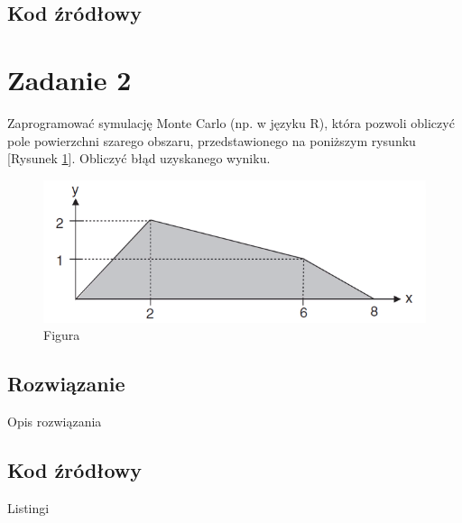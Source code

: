\documentclass[a4paper,11pt,titlepage]{article}
\begin{document}
\subsection{Kod źródłowy}




\section{Zadanie 2}
Zaprogramować symulację Monte Carlo (np. w języku R), która pozwoli obliczyć pole powierzchni szarego obszaru, przedstawionego na poniższym rysunku [Rysunek \ref{fig:wykres2}]. Obliczyć błąd uzyskanego wyniku.

\begin{figure}[H]
\centering
\includegraphics[width=1\columnwidth]{img/zad2.PNG}
\caption{Figura}
\label{fig:wykres2}
\end{figure}

\subsection{Rozwiązanie}
Opis rozwiązania

\subsection{Kod źródłowy}
Listingi
\end{document}
